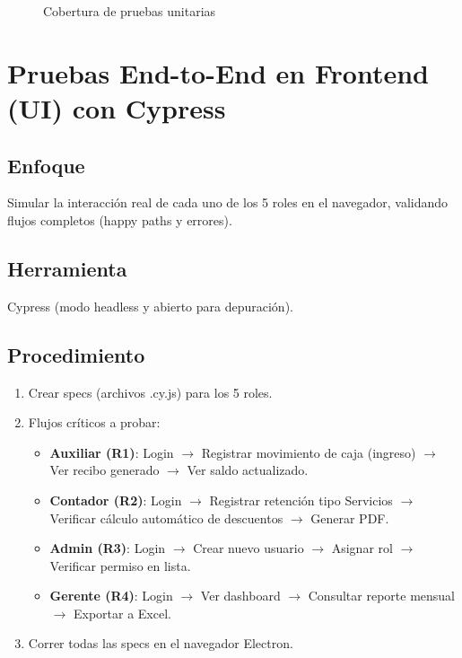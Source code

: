\documentclass[stu]{apa7}
\begin{document}
\begin{figure}[H]
\centering
{}
\caption{Cobertura de pruebas unitarias}
\end{figure}

\section{Pruebas End-to-End en Frontend (UI) con Cypress}

\subsection{Enfoque}

Simular la interacción real de cada uno de los 5 roles en el navegador, validando flujos completos (happy paths y errores).

\subsection{Herramienta}

Cypress (modo headless y abierto para depuración).

\subsection{Procedimiento}

\begin{enumerate}
    \item Crear specs (archivos .cy.js) para los 5 roles.
    \item Flujos críticos a probar:
    \begin{itemize}
        \item \textbf{Auxiliar (R1)}: Login $\rightarrow$ Registrar movimiento de caja (ingreso) $\rightarrow$ Ver recibo generado $\rightarrow$ Ver saldo actualizado.
        \item \textbf{Contador (R2)}: Login $\rightarrow$ Registrar retención tipo Servicios $\rightarrow$ Verificar cálculo automático de descuentos $\rightarrow$ Generar PDF.
        \item \textbf{Admin (R3)}: Login $\rightarrow$ Crear nuevo usuario $\rightarrow$ Asignar rol $\rightarrow$ Verificar permiso en lista.
        \item \textbf{Gerente (R4)}: Login $\rightarrow$ Ver dashboard $\rightarrow$ Consultar reporte mensual $\rightarrow$ Exportar a Excel.
    \end{itemize}
    \item Correr todas las specs en el navegador Electron.
\end{enumerate}
\end{document}
